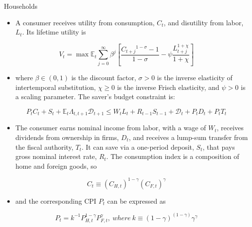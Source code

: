 \documentclass[10pt]{beamer}
\begin{document}
\begin{frame}{Households}
\fontsize{8}{8}\selectfont

\begin{itemize}
    \item A consumer receives utility from consumption, $C_{t}$, and disutility from labor, $L_{t}$. Its lifetime utility is
\end{itemize}


$$
V_{t}=\max \mathbb{E}_{t} \sum_{j=0}^{\infty} \beta^{j}\left[\frac{C_{t+j}{ }^{1-\sigma}-1}{1-\sigma}-\psi \frac{L_{t+j}^{1+\chi}}{1+\chi}\right]
$$

\begin{itemize}
    \item where $\beta \in(0,1)$ is the discount factor, $\sigma>0$ is the inverse elasticity of intertemporal substitution, $\chi \geq 0$ is the inverse Frisch elasticity, and $\psi>0$ is a scaling parameter. The saver's budget constraint is:
\end{itemize}


$$
P_{t} C_{t}+S_{t}+\mathbb{E}_{t} \Lambda_{t, t+1} \mathcal{D}_{t+1} \leq W_{t} L_{t}+R_{t-1} S_{t-1}+\mathcal{D}_{t}+P_{t} D_{t}+P_{t} T_{t}
$$



\begin{itemize}
    \item The consumer earns nominal income from labor, with a wage of $W_{t}$, receives dividends from ownership in firms, $D_{t}$, and receives a lump-sum transfer from the fiscal authority, $T_{t}$. It can save via a one-period deposit, $S_{t}$, that pays gross nominal interest rate, $R_{t}$. The consumption index is a composition of home and foreign goods, so
\end{itemize}



$$
C_{t}\equiv\left(C_{H, t}\right)^{1-\gamma}\left(C_{F, t}\right)^{\gamma}
$$

\begin{itemize}
    \item and the corresponding CPI $P_{t}$ can be expressed as
\end{itemize}

$$
P_{t}=k^{-1} P_{H, t}^{1-\gamma} P_{F, t}^{\gamma}, \ where \ k \equiv(1-\gamma)^{(1-\gamma)} \gamma^{\gamma}
$$

\end{frame}
\end{document}
